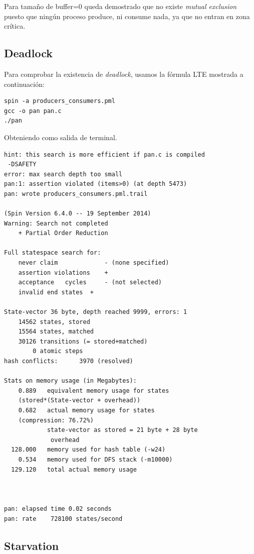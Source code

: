 \documentclass[a4paper,12pt]{article}
\begin{document}
Para tamaño de buffer=0 queda demostrado que no existe \textit{mutual exclusion} puesto que ningún proceso produce, ni consume nada, ya que no entran en zona crítica.

\subsection{Deadlock}

Para comprobar la existencia de \textit{deadlock}, usamos la  fórmula LTE mostrada a continuación:

\begin{lstlisting}[frame=single]
spin -a producers_consumers.pml
gcc -o pan pan.c 
./pan
\end{lstlisting}

Obteniendo como salida de terminal.

\begin{lstlisting}[frame=single]
hint: this search is more efficient if pan.c is compiled
 -DSAFETY
error: max search depth too small
pan:1: assertion violated (items>0) (at depth 5473)
pan: wrote producers_consumers.pml.trail

(Spin Version 6.4.0 -- 19 September 2014)
Warning: Search not completed
	+ Partial Order Reduction

Full statespace search for:
	never claim         	- (none specified)
	assertion violations	+
	acceptance   cycles 	- (not selected)
	invalid end states	+

State-vector 36 byte, depth reached 9999, errors: 1
    14562 states, stored
    15564 states, matched
    30126 transitions (= stored+matched)
        0 atomic steps
hash conflicts:      3970 (resolved)

Stats on memory usage (in Megabytes):
    0.889	equivalent memory usage for states 
    (stored*(State-vector + overhead))
    0.682	actual memory usage for states 
    (compression: 76.72%)
         	state-vector as stored = 21 byte + 28 byte
         	 overhead
  128.000	memory used for hash table (-w24)
    0.534	memory used for DFS stack (-m10000)
  129.120	total actual memory usage



pan: elapsed time 0.02 seconds
pan: rate    728100 states/second
\end{lstlisting}

\subsection{Starvation}
\end{document}
